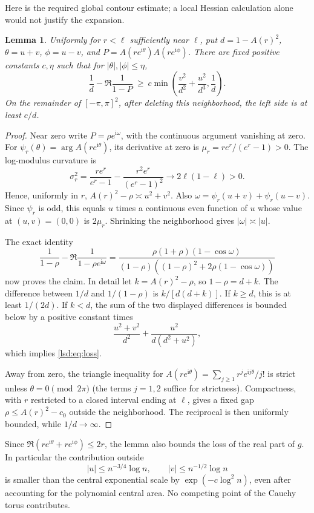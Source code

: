 \documentclass[11pt]{article}
\newtheorem{lemma}{Lemma}
\newcommand{\ii}{\mathrm i}
\theoremstyle{remark}\newtheorem{remark}{Remark}
\begin{document}
Here is the required global contour estimate; a local Hessian calculation alone would not justify the expansion.
\begin{lemma}\label{lsd:lem:arc}
Uniformly for $r<\ell$ sufficiently near $\ell$, put
$d=1-A(r)^2$, $\theta=u+v$, $\phi=u-v$, and
$P=A(re^{\ii\theta})A(re^{\ii\phi})$.
There are fixed positive constants $c,\eta$ such that for
$|\theta|,|\phi|\leq\eta$,
\begin{equation}\label{lsd:eq:loss}
 \frac1d-\Re\frac1{1-P}
 \ \geq\ c\min\left(\frac{v^2}{d^2}+\frac{u^2}{d^3},\frac1d\right).
\end{equation}
On the remainder of $[-\pi,\pi]^2$, after deleting this neighborhood, the left side is at least $c/d$.
\end{lemma}
\begin{proof}
Near zero write
$P=\rho e^{\ii\omega}$, with the continuous argument vanishing at zero.
For $\psi_r(\theta)=\arg A(re^{\ii\theta})$, its derivative at zero is
$\mu_r=re^r/(e^r-1)>0$. The log-modulus curvature is
\[
 \sigma_r^2=\frac{re^r}{e^r-1}-\frac{r^2e^r}{(e^r-1)^2}
 \longrightarrow 2\ell(1-\ell)>0.
\]
Hence, uniformly in $r$, $A(r)^2-\rho\asymp u^2+v^2$.
Also $\omega=\psi_r(u+v)+\psi_r(u-v)$.
Since $\psi_r$ is odd, this equals $u$ times a continuous even function of $u$ whose value at $(u,v)=(0,0)$ is $2\mu_r$. Shrinking the neighborhood gives $|\omega|\asymp|u|$.

The exact identity
\[
 \frac1{1-\rho}-\Re\frac1{1-\rho e^{\ii\omega}}
 =\frac{\rho(1+\rho)(1-\cos\omega)}
 {(1-\rho)((1-\rho)^2+2\rho(1-\cos\omega))}
\]
now proves the claim. In detail let $k=A(r)^2-\rho$, so $1-\rho=d+k$.
The difference between $1/d$ and $1/(1-\rho)$ is $k/[d(d+k)]$.
If $k\geq d$, this is at least $1/(2d)$.
If $k<d$, the sum of the two displayed differences is bounded below by a positive constant times
\[
 \frac{u^2+v^2}{d^2}+\frac{u^2}{d(d^2+u^2)},
\]
which implies \eqref{lsd:eq:loss}.

Away from zero, the triangle inequality for
$A(re^{\ii\theta})=\sum_{j\geq1}r^je^{\ii j\theta}/j!$
is strict unless $\theta=0\pmod{2\pi}$ (the terms $j=1,2$ suffice for strictness). Compactness, with $r$ restricted to a closed interval ending at $\ell$, gives a fixed gap $\rho\leq A(r)^2-c_0$ outside the neighborhood. The reciprocal is then uniformly bounded, while $1/d\to\infty$.
\end{proof}
Since $\Re(re^{\ii\theta}+re^{\ii\phi})\leq2r$, the lemma also bounds the loss of the real part of $g$. In particular the contribution outside
\[
 |u|\leq n^{-3/4}\log n,\qquad |v|\leq n^{-1/2}\log n
\]
is smaller than the central exponential scale by $\exp(-c\log^2 n)$, even after accounting for the polynomial central area. No competing point of the Cauchy torus contributes.
\end{document}
